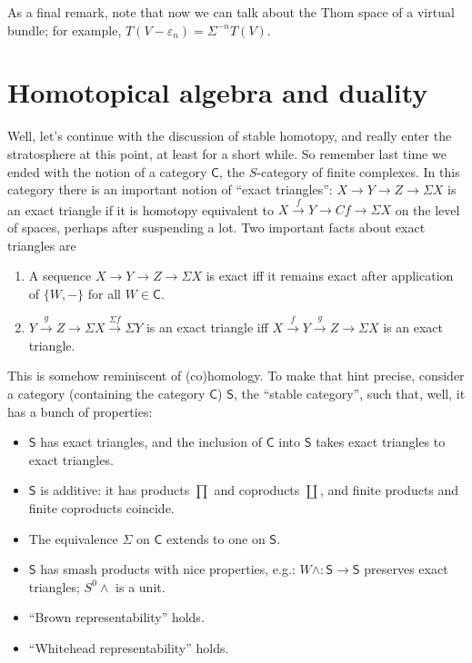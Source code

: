 \documentclass{article}
\providecommand{\OutputHomotopicalAlgebraAndDuality}{18}
\newcommand{\BoxedNote}[1]{
\begin{center}\fbox{\begin{minipage}{.75\textwidth}
#1
\end{minipage}}
\end{center}
}
\newcommand{\sprod}{\wedge}
\newcommand{\CatOf}[1]{\mathsf{#1}}
\newcommand{\Suspend}{\Sigma}
\renewcommand{\to}{\longrightarrow}
\theoremstyle{definition}
\begin{document}
As a final remark, note that now we can talk about the Thom space of a virtual bundle; for example, $T(V - \varepsilon_n) = \Suspend^{-n} T(V)$.

\fi
\BoxedNote{}
\section{Homotopical algebra and duality} %
\label{HomotopicalAlgebraAndDuality}
\ifx\OutputHomotopicalAlgebraAndDuality\undefined\else
Well, let's continue with the discussion of stable homotopy, and really enter the stratosphere at this point, at least for a short while.  So remember last time we ended with the notion of a category $\CatOf{C}$, the $S$-category of finite complexes.  In this category there is an important notion of ``exact triangles'': $X \to Y \to Z \to \Suspend X$ is an exact triangle if it is homotopy equivalent to $X \stackrel{f}{\to} Y \to Cf \to \Suspend X$ on the level of spaces, perhaps after suspending a lot.  Two important facts about exact triangles are
\begin{enumerate}
\item A sequence $X \to Y \to Z \to \Suspend X$ is exact iff it remains exact after application of $\{W, -\}$ for all $W \in \CatOf{C}$.
\item $Y \stackrel{g}{\to} Z \to \Suspend X \stackrel{\Suspend f}{\to} \Suspend Y$ is an exact triangle iff $X \stackrel{f}{\to} Y \stackrel{g}{\to} Z \to \Suspend X$ is an exact triangle.
\end{enumerate}
This is somehow reminiscent of (co)homology. To make that hint precise, consider a category (containing the category $\CatOf{C}$) $\CatOf{S}$, the ``stable category'', such that, well, it has a bunch of properties:
\begin{itemize}
\item $\CatOf{S}$ has exact triangles, and the inclusion of $\CatOf{C}$ into $\CatOf{S}$ takes exact triangles to exact triangles.
\item $\CatOf{S}$ is additive: it has products $\prod$ and coproducts $\coprod$, and finite products and finite coproducts coincide.
\item The equivalence $\Suspend$ on $\CatOf{C}$ extends to one on $\CatOf{S}$.
\item $\CatOf{S}$ has smash products with nice properties, e.g.: $W \sprod: \CatOf{S} \to \CatOf{S}$ preserves exact triangles; $S^0 \sprod$ is a unit.
\item ``Brown representability'' holds.
\item ``Whitehead representability'' holds.
\end{itemize}
\end{document}
